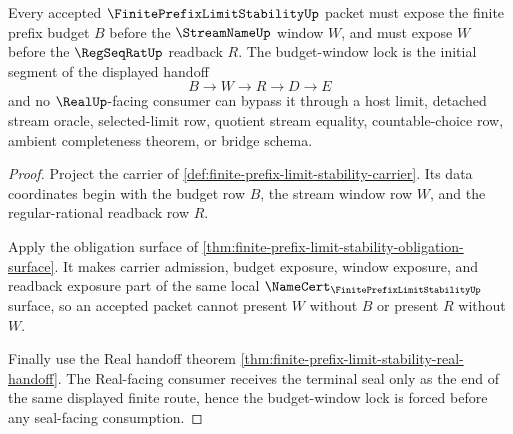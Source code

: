 \begin{theorem}
\label{thm:finite-prefix-limit-stability-budget-window-lock}
Every accepted $\FinitePrefixLimitStabilityUp$ packet must expose the finite prefix budget $B$ before the $\StreamNameUp$ window $W$, and must expose $W$ before the $\RegSeqRatUp$ readback $R$. The budget-window lock is the initial segment of the displayed handoff
$$
B \to W \to R \to D \to E
$$
and no $\RealUp$-facing consumer can bypass it through a host limit, detached stream oracle, selected-limit row, quotient stream equality, countable-choice row, ambient completeness theorem, or bridge schema.
\end{theorem}
\begin{proof}
Project the carrier of \autoref{def:finite-prefix-limit-stability-carrier}. Its data coordinates begin with the budget row $B$, the stream window row $W$, and the regular-rational readback row $R$.

Apply the obligation surface of \autoref{thm:finite-prefix-limit-stability-obligation-surface}. It makes carrier admission, budget exposure, window exposure, and readback exposure part of the same local $\NameCert_{\FinitePrefixLimitStabilityUp}$ surface, so an accepted packet cannot present $W$ without $B$ or present $R$ without $W$.

Finally use the Real handoff theorem \autoref{thm:finite-prefix-limit-stability-real-handoff}. The Real-facing consumer receives the terminal seal only as the end of the same displayed finite route, hence the budget-window lock is forced before any seal-facing consumption.
\end{proof}

